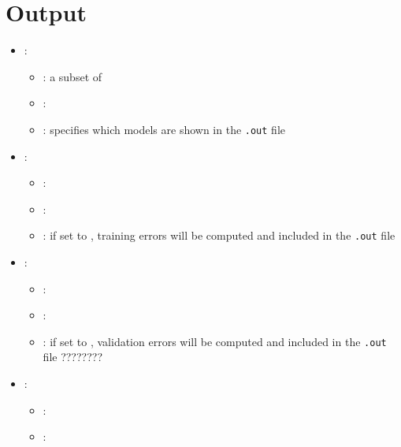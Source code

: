 \section{Output}



\begin{itemize}
    \item {}:
           \begin{itemize}
                \item \optionPossibleValues{}: a subset of 
                \item \optionDefaultValue{}: 
                \item \optionDescrption{}: specifies which models are shown in the \texttt{.out} file
           \end{itemize}
    \item {}:
           \begin{itemize}
                \item \optionPossibleValues{}: 
                \item \optionDefaultValue{}: 
                \item \optionDescrption{}: if set to , training errors will be computed and included in the \texttt{.out} file
           \end{itemize}
    \item {}:
           \begin{itemize}
                \item \optionPossibleValues{}: 
                \item \optionDefaultValue{}: 
                \item \optionDescrption{}: if set to , validation errors will be computed and included in the \texttt{.out} file ????????
           \end{itemize}
    \item {}:
           \begin{itemize}
                \item \optionPossibleValues{}: 
                \item \optionDefaultValue{}: 

\end{itemize}
\end{itemize}
